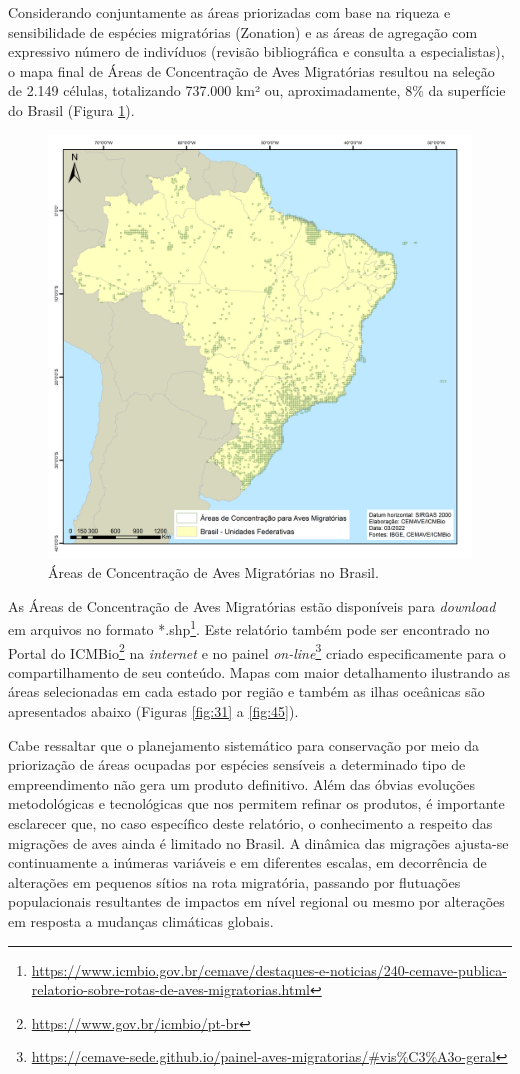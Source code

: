 \documentclass[
  oneside]{scrbook}
\DeclareRobustCommand{\href}[2]{#2\footnote{\url{#1}}}
\begin{document}
Considerando conjuntamente as áreas priorizadas com base na riqueza e sensibilidade de espécies migratórias (Zonation) e as áreas de agregação com expressivo número de indivíduos (revisão bibliográfica e consulta a especialistas), o mapa final de Áreas de Concentração de Aves Migratórias resultou na seleção de 2.149 células, totalizando 737.000 km² ou, aproximadamente, 8\% da superfície do Brasil (Figura \ref{fig:30}).

\begin{figure}[H]

{\centering \includegraphics[width=0.75\linewidth]{imagens/cap07/Figura_7.10} 

}

\caption{Áreas de Concentração de Aves Migratórias no Brasil.}\label{fig:30}
\end{figure}

As Áreas de Concentração de Aves Migratórias estão disponíveis para \emph{download} em \href{https://www.icmbio.gov.br/cemave/destaques-e-noticias/240-cemave-publica-relatorio-sobre-rotas-de-aves-migratorias.html}{arquivos no formato *.shp}. Este relatório também pode ser encontrado no \href{https://www.gov.br/icmbio/pt-br}{Portal do ICMBio} na \emph{internet} e no \href{https://cemave-sede.github.io/painel-aves-migratorias/\#vis\%C3\%A3o-geral}{painel \emph{on-line}} criado especificamente para o compartilhamento de seu conteúdo. Mapas com maior detalhamento ilustrando as áreas selecionadas em cada estado por região e também as ilhas oceânicas são apresentados abaixo (Figuras \ref{fig:31} a \ref{fig:45}).

Cabe ressaltar que o planejamento sistemático para conservação por meio da priorização de áreas ocupadas por espécies sensíveis a determinado tipo de empreendimento não gera um produto definitivo. Além das óbvias evoluções metodológicas e tecnológicas que nos permitem refinar os produtos, é importante esclarecer que, no caso específico deste relatório, o conhecimento a respeito das migrações de aves ainda é limitado no Brasil. A dinâmica das migrações ajusta-se continuamente a inúmeras variáveis e em diferentes escalas, em decorrência de alterações em pequenos sítios na rota migratória, passando por flutuações populacionais resultantes de impactos em nível regional ou mesmo por alterações em resposta a mudanças climáticas globais.
\end{document}
